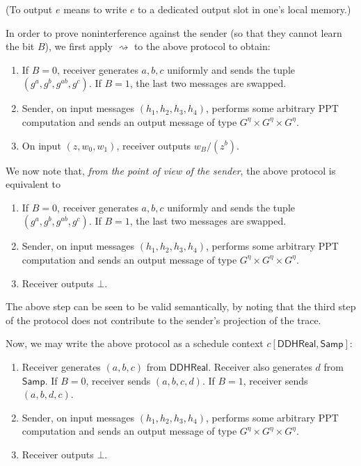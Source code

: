 \documentclass{article}
\begin{document}
(To output $e$ means to write $e$ to a dedicated output slot in one's local memory.)

In order to prove noninterference against the sender (so that they cannot learn the bit $B$), we first apply $\rightsquigarrow$ to the above protocol to obtain:
\begin{enumerate}
    \item If $B=0$, receiver generates $a,b,c$ uniformly and sends the tuple $(g^a, g^b, g^{ab}, g^c)$. If $B=1$, the last two messages are swapped.
    \item Sender, on input messages $(h_1, h_2, h_3, h_4)$, performs some arbitrary PPT computation and sends an output message of type $G^\eta \times G^\eta \times G^\eta$.
    \item On input $(z, w_0, w_1)$, receiver outputs $w_B / (z^b)$.
\end{enumerate}

We now note that, \emph{from the point of view of the sender}, the above protocol is equivalent to
\begin{enumerate}
    \item If $B=0$, receiver generates $a,b,c$ uniformly and sends the tuple $(g^a, g^b, g^{ab}, g^c)$. If $B=1$, the last two messages are swapped.
    \item Sender, on input messages $(h_1, h_2, h_3, h_4)$, performs some arbitrary PPT computation and sends an output message of type $G^\eta \times G^\eta \times G^\eta$.
    \item Receiver outputs $\bot$.
\end{enumerate}

The above step can be seen to be valid semantically, by noting that the third step of the protocol does not contribute to the sender's projection of the trace.

Now, we may write the above protocol as a schedule context $c[\textsf{DDHReal}, \textsf{Samp}]$:
\begin{enumerate}
    \item Receiver generates $(a,b,c)$ from $\textsf{DDHReal}$. Receiver also generates $d$ from $\textsf{Samp}$. If $B=0$, receiver sends $(a,b,c,d)$. If $B=1$, receiver sends $(a,b,d,c)$. 
    \item Sender, on input messages $(h_1, h_2, h_3, h_4)$, performs some arbitrary PPT computation and sends an output message of type $G^\eta \times G^\eta \times G^\eta$.
    \item Receiver outputs $\bot$.
\end{enumerate}
\end{document}
